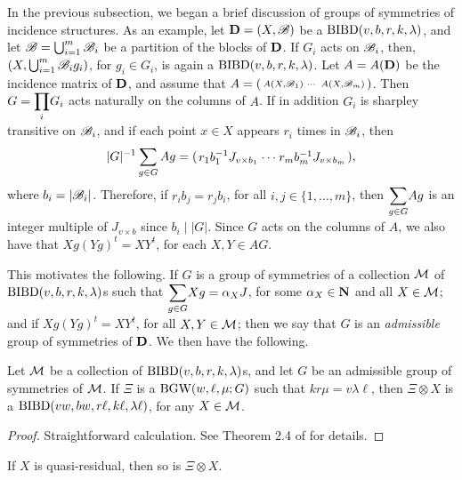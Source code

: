 \documentclass[../../../main]{subfiles}
\begin{document}
In the previous subsection, we began a brief discussion of groups of symmetries of incidence structures. As an example, let $\mathbf{D}=(X,\mathscr{B})$ be a $\text{BIBD}(v,b,r,k,\lambda)$, and let $\mathscr{B} = \bigcup_{i=1}^m \mathscr{B}_i$ be a partition of the blocks of $\mathbf{D}$. If $G_i$ acts on $\mathscr{B}_i$, then, $(X,\bigcup_{i=1}^m\mathscr{B}_ig_i)$, for $g_i \in G_i$, is again a $\text{BIBD}(v,b,r,k,\lambda)$. Let $A=A(\mathbf{D})$ be the incidence matrix of $\mathbf{D}$, and assume that $A = \left(\begin{smallmatrix} A(X,\mathscr{B}_1) & \cdots & A(X,\mathscr{B}_m) \end{smallmatrix}\right)$. Then $G=\pprod_iG_i$ acts naturally on the columns of $A$. If in addition $G_i$ is sharpley transitive on $\mathscr{B}_i$, and if each point $x \in X$ appears $r_i$ times in $\mathscr{B}_i$, then 
 \[
 \arraycolsep=1.25pt\def\arraystretch{0.625}
 \abs{G}^{-1}\sum_{g \in G}Ag = (\begin{array}{ccc} r_1b_1^{-1}J_{v \times b_1} & \cdots & r_mb_m^{-1}J_{v \times b_m} \end{array}),
 \]
 where $b_i=|\mathscr{B}_i|$. Therefore, if $r_ib_j=r_jb_i$, for all $i,j \in \{1,\dots,m\}$, then $\ssum_{g \in G}Ag$ is an integer multiple of $J_{v \times b}$ since $b_i \mid |G|$. Since $G$ acts on the columns of $A$, we also have that $Xg(Yg)^t = XY^t$, for each $X,Y \in AG$. 
 
 This motivates the following. If $G$ is a group of symmetries of a collection $\mathcal{M}$ of $\text{BIBD}(v,b,r,k,\lambda)$s such that $\ssum_{g \in G}Xg = \alpha_XJ$, for some $\alpha_X \in \mathbf{N}$ and all $X \in \mathcal{M}$; and if $Xg(Yg)^t = XY^t$, for all $X,Y \in \mathcal{M}$; then we say that $G$ is an {\it admissible} group of symmetries of $\mathbf{D}$. We then have the following.
 
 \begin{thm}\label{bibd-bgw-thm}
  Let $\mathcal{M}$ be a collection of $\text{BIBD}(v,b,r,k,\lambda)$s, and let $G$ be an admissible group of symmetries of $\mathcal{M}$. If $\Xi$ is a $\text{BGW}(w,\ell,\mu;G)$ such that $kr\mu=v\lambda\ell$, then $\Xi \otimes X$ is a $\text{BIBD}(vw,bw,r\ell,k\ell,\lambda\ell)$, for any $X \in \mathcal{M}$.
 \end{thm}
 
 \begin{proof}
  Straightforward calculation. See Theorem 2.4 of \cite{ionin-bgw-bibd} for details.
 \end{proof}
 
 \begin{cor}
  If $X$ is quasi-residual, then so is $\Xi \otimes X$.
 \end{cor}
 
\end{document}
